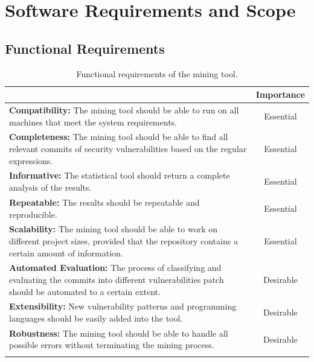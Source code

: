\documentclass[12pt, a4paper]{report}
\begin{document}
\section{Software Requirements and Scope} \label{sec:software_req}
\subsection{Functional Requirements}
\begin{longtable}{|p{10.3cm}|c|}
  \hline \endfirsthead
  \rowcolor[HTML]{D8D8D8}
  \multicolumn{1}{|c|}{Criteria} & Importance \\ \hline
  \textbf{Compatibility:} The mining tool should be able to run on all machines that meet the
  system requirements. & Essential \\ \hline
  \textbf{Completeness:} The mining tool should be able to find all relevant commits of security
  vulnerabilities based on the regular expressions. & Essential \\ \hline
  \textbf{Informative:} The statistical tool should return a complete analysis of the results. &
  Essential \\ \hline
  \textbf{Repeatable:} The results should be repeatable and reproducible. & Essential \\ \hline
  \textbf{Scalability:} The mining tool should be able to work on different project sizes, provided
  that the repository contains a certain amount of information. & Essential \\ \hline
  \textbf{Automated Evaluation:} The process of classifying and evaluating the commits into
  different vulnerabilities patch should be automated to a certain extent. & Desirable \\ \hline
  \textbf{Extensibility:} New vulnerability patterns and programming languages should be easily
  added into the tool. & Desirable \\ \hline
  \textbf{Robustness:} The mining tool should be able to handle all possible errors without
  terminating the mining process. & Desirable \\ \hline
  \caption{Functional requirements of the mining tool.} \label{table:func_req}
\end{longtable}
\end{document}
